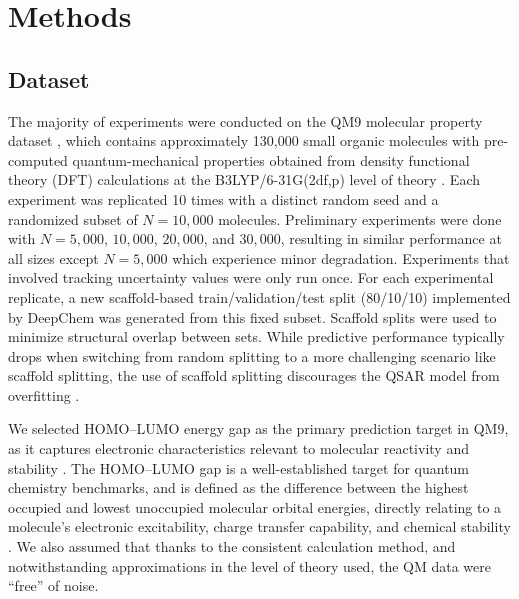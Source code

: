 \documentclass[pdflatex,sn-basic]{sn-jnl}%
\theoremstyle{thmstyleone}%
\theoremstyle{thmstyletwo}%
\theoremstyle{thmstylethree}%
\begin{document}
\section{Methods}\label{sec2}

\subsection{Dataset}
The majority of experiments were conducted on the QM9 molecular property dataset \citep{Ramakrishnan2014}, which contains approximately 130,000 small organic molecules with pre-computed quantum-mechanical properties obtained from density functional theory (DFT) calculations at the B3LYP/6-31G(2df,p) level of theory \citep{Ramakrishnan2014}. Each experiment was replicated 10 times with a distinct random seed and a randomized subset of $N = 10{,}000$ molecules. Preliminary experiments were done with $N = 5{,}000$, $10{,}000$, $20{,}000$, and $30{,}000$, resulting in similar performance at all sizes except $N = 5{,}000$ which experience minor degradation. Experiments that involved tracking uncertainty values were only run once. For each experimental replicate, a new scaffold-based train/validation/test split (80/10/10) implemented by DeepChem \citep{deepchem} was generated from this fixed subset. Scaffold splits were used to minimize structural overlap between sets. While predictive performance typically drops when switching from random splitting to a more challenging scenario like scaffold splitting, the use of scaffold splitting discourages the QSAR model from overfitting \citep{Heid2023}.

We selected HOMO--LUMO energy gap as the primary prediction target in QM9, as it captures electronic characteristics relevant to molecular reactivity and stability \citep{Islam2019, Hllermeier2021}. The HOMO--LUMO gap is a well-established target for quantum chemistry benchmarks, and is defined as the difference between the highest occupied and lowest unoccupied molecular orbital energies, directly relating to a molecule's electronic excitability, charge transfer capability, and chemical stability \citep{Fediai2023}. We also assumed that thanks to the consistent calculation method, and notwithstanding approximations in the level of theory used, the QM data were ``free'' of noise.
\end{document}
